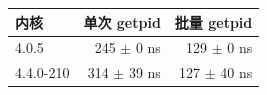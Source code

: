 \begin{tabular}{@{}lrr@{}}
\toprule
内核 & 单次 getpid & 批量 getpid \\
\midrule
4.0.5 & 245 $\pm$ 0 ns & 129 $\pm$ 0 ns \\
4.4.0-210 & 314 $\pm$ 39 ns & 127 $\pm$ 40 ns \\
\bottomrule
\end{tabular}
